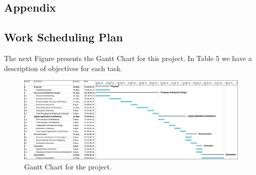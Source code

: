 
\begin{landscape}

\section{Appendix} %
\label{sec:attachments}


\subsection{Work Scheduling Plan} 

The next Figure presents the Gantt Chart for this project. In Table 5 we have a description of objectives for each task.



\begin{figure}[h!]
\centering
\includegraphics[height=0.55\textheight]{img/GanttChart2.png}
\caption{Gantt Chart for the project.}
\end{figure}

\end{landscape}

\newpage



